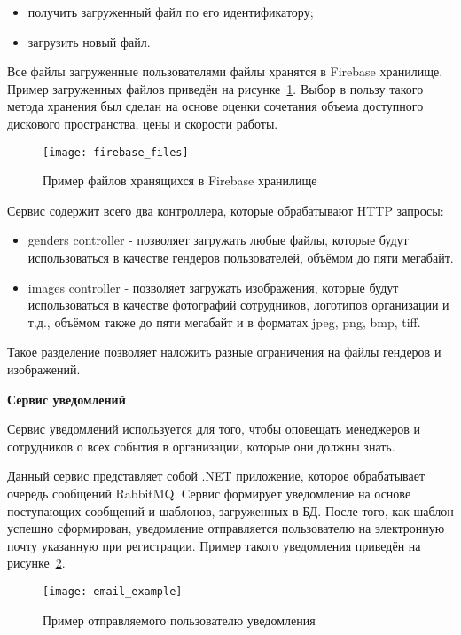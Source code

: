 \begin{itemize}
    \item получить загруженный файл по его идентификатору;
    \item загрузить новый файл.
\end{itemize}

Все файлы загруженные пользователями файлы хранятся в Firebase хранилище. Пример загруженных файлов приведён на рисунке~\ref{fig:firebase_files}. Выбор в пользу такого метода хранения был сделан на основе оценки сочетания объема доступного дискового пространства, цены и скорости работы.

\begin{figure}[ht]
    \centering
    \texttt{[image: firebase\_files]}
    \caption{Пример файлов хранящихся в Firebase хранилище}\label{fig:firebase_files}
\end{figure}

Сервис содержит всего два контроллера, которые обрабатывают HTTP запросы:
\begin{itemize}
    \item genders controller - позволяет загружать любые файлы, которые будут использоваться в качестве гендеров пользователей, объёмом до пяти мегабайт.
    \item images controller - позволяет загружать изображения, которые будут использоваться в качестве фотографий сотрудников, логотипов организации и т.д., объёмом также до пяти мегабайт и в форматах jpeg, png, bmp, tiff.
\end{itemize}

Такое разделение позволяет наложить разные ограничения на файлы гендеров и изображений.

\bigskip
\textbf{Сервис уведомлений}

Сервис уведомлений используется для того, чтобы оповещать менеджеров и сотрудников о всех события в организации, которые они должны знать.

Данный сервис представляет собой .NET приложение, которое обрабатывает очередь сообщений RabbitMQ. Сервис формирует уведомление на основе поступающих сообщений и шаблонов, загруженных в БД. После того, как шаблон успешно сформирован, уведомление отправляется пользователю на электронную почту указанную при регистрации. Пример такого уведомления приведён на рисунке~\ref{fig:email_example}.

\begin{figure}[ht]
    \centering
    \texttt{[image: email\_example]}
    \caption{Пример отправляемого пользователю уведомления}\label{fig:email_example}
\end{figure}

